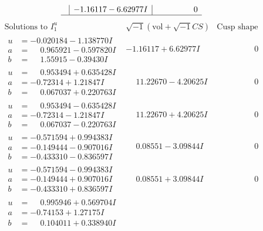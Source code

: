 \documentclass[1p]{elsarticle_modified}
\theoremstyle{definition}
\newcommand{\I}{\sqrt{-1}}
\begin{document}
$$\begin{array}{c|c|c}
 & -1.16117 - 6.62977 I & \phantom{-0.000000 } 0\\
 \hline 
 \end{array}$$\newpage$$\begin{array}{c|c|c}  
\text{Solutions to }I^u_{1}& \I (\text{vol} + \sqrt{-1}CS) & \text{Cusp shape}\\
 \hline 
\begin{aligned}
u &= -0.020184 - 1.138770 I \\
a &= \phantom{-}0.965921 - 0.597820 I \\
b &= \phantom{-}1.55915 - 0.39430 I\end{aligned}
 & -1.16117 + 6.62977 I & \phantom{-0.000000 } 0 \\ \hline\begin{aligned}
u &= \phantom{-}0.953494 + 0.635428 I \\
a &= -0.72314 + 1.21847 I \\
b &= \phantom{-}0.067037 + 0.220763 I\end{aligned}
 & \phantom{-}11.22670 - 4.20625 I & \phantom{-0.000000 } 0 \\ \hline\begin{aligned}
u &= \phantom{-}0.953494 - 0.635428 I \\
a &= -0.72314 - 1.21847 I \\
b &= \phantom{-}0.067037 - 0.220763 I\end{aligned}
 & \phantom{-}11.22670 + 4.20625 I & \phantom{-0.000000 } 0 \\ \hline\begin{aligned}
u &= -0.571594 + 0.994383 I \\
a &= -0.149444 - 0.907016 I \\
b &= -0.433310 - 0.836597 I\end{aligned}
 & \phantom{-}0.08551 - 3.09844 I & \phantom{-0.000000 } 0 \\ \hline\begin{aligned}
u &= -0.571594 - 0.994383 I \\
a &= -0.149444 + 0.907016 I \\
b &= -0.433310 + 0.836597 I\end{aligned}
 & \phantom{-}0.08551 + 3.09844 I & \phantom{-0.000000 } 0 \\ \hline\begin{aligned}
u &= \phantom{-}0.995946 + 0.569704 I \\
a &= -0.74153 + 1.27175 I \\
b &= \phantom{-}0.104011 + 0.338940 I\end{aligned}

\end{array}$$
\end{document}
